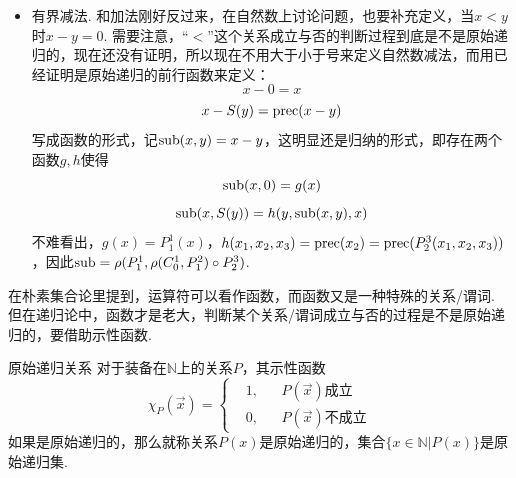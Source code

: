 \begin{itemize}
    \item 有界减法. 和加法刚好反过来，在自然数上讨论问题，也要补充定义，当\(x<y\)时\(x-y=0\). 需要注意，“\(<\)”这个关系成立与否的判断过程到底是不是原始递归的，现在还没有证明，所以现在不用大于小于号来定义自然数减法，而用已经证明是原始递归的前行函数来定义：
    \[x-0 = x\]
    \[x-S(y) = {\rm prec}(x-y)\]
    写成函数的形式，记\({\rm sub}(x,y)=x-y\)，这明显还是归纳的形式，即存在两个函数\(g,h\)使得
    \[{\rm sub}(x,0)=g(x)\]
    \[{\rm sub}(x,S(y))=h(y,{\rm sub}(x,y),x)\]
    不难看出，\(g(x) = P^1_1(x)\)，\(h(x_1,x_2,x_3)={\rm prec}(x_2) = {\rm prec}(P^3_2(x_1,x_2,x_3))\)，因此\({\rm sub} = \rho(P^1_1, \rho(C^1_0, P^2_1) \circ P^3_2)\).
    
\end{itemize}

在朴素集合论里提到，运算符可以看作函数，而函数又是一种特殊的关系/谓词. 但在递归论中，函数才是老大，判断某个关系/谓词成立与否的过程是不是原始递归的，要借助示性函数.

\begin{definition}{原始递归关系}
    对于装备在\(\mathbb{N}\)上的关系\(P\)，其示性函数
    \[\chi_P(\vec x) = \left\{\begin{aligned}
        &1, &&P(\vec x)\mbox{成立} \\
        &0, &&P(\vec x)\mbox{不成立}
    \end{aligned}\right.\]
    如果是原始递归的，那么就称关系\(P(x)\)是原始递归的，集合\(\{x \in \mathbb{N}| P(x)\}\)是原始递归集.
\end{definition}

